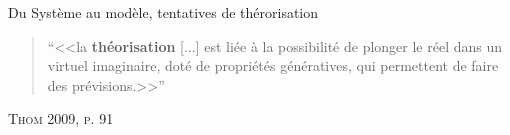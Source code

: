 \documentclass[newPxFont]{beamer}
\begin{document}
\begin{frame}[c]{Du Système au modèle, tentatives de thérorisation}
\vspace{-1em}
\begin{quote}
  \enquote{<<la \textbf{théorisation} [...] est liée à la possibilité de plonger le réel dans un virtuel imaginaire, doté de propriétés génératives, qui permettent de faire des prévisions.>>}
\end{quote}
\hspace*{\fill}\textsc{Thom 2009, p. 91}
\vspace{-0.5em}
\begin{figure}
 	\centering
 		\hspace{0.2em}%
    \hspace{0.2em}%
 		\hspace{0.2em}%
\end{figure}
\end{frame}
\end{document}
